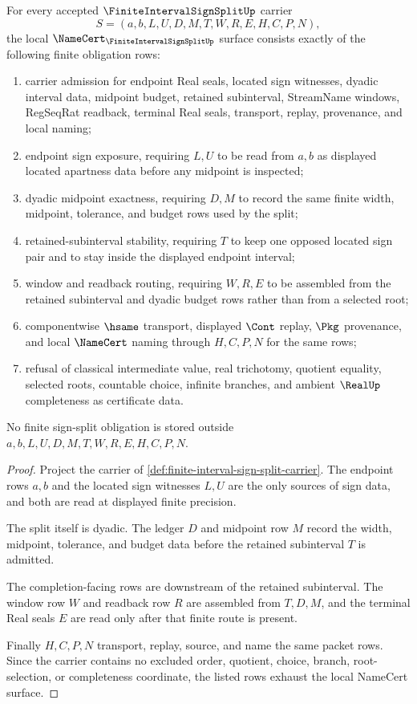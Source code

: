 \begin{theorem}
\label{thm:finite-interval-sign-split-namecert-obligations}
For every accepted $\FiniteIntervalSignSplitUp$ carrier
$$
S=(a,b,L,U,D,M,T,W,R,E,H,C,P,N),
$$
the local $\NameCert_{\FiniteIntervalSignSplitUp}$ surface consists exactly of the following finite obligation rows:
\begin{enumerate}
\item carrier admission for endpoint Real seals, located sign witnesses, dyadic interval data, midpoint budget, retained subinterval, StreamName windows, RegSeqRat readback, terminal Real seals, transport, replay, provenance, and local naming;
\item endpoint sign exposure, requiring $L,U$ to be read from $a,b$ as displayed located apartness data before any midpoint is inspected;
\item dyadic midpoint exactness, requiring $D,M$ to record the same finite width, midpoint, tolerance, and budget rows used by the split;
\item retained-subinterval stability, requiring $T$ to keep one opposed located sign pair and to stay inside the displayed endpoint interval;
\item window and readback routing, requiring $W,R,E$ to be assembled from the retained subinterval and dyadic budget rows rather than from a selected root;
\item componentwise $\hsame$ transport, displayed $\Cont$ replay, $\Pkg$ provenance, and local $\NameCert$ naming through $H,C,P,N$ for the same rows;
\item refusal of classical intermediate value, real trichotomy, quotient equality, selected roots, countable choice, infinite branches, and ambient $\RealUp$ completeness as certificate data.
\end{enumerate}
No finite sign-split obligation is stored outside $a,b,L,U,D,M,T,W,R,E,H,C,P,N$.
\end{theorem}
\begin{proof}
Project the carrier of \autoref{def:finite-interval-sign-split-carrier}. The endpoint rows $a,b$ and the located sign witnesses $L,U$ are the only sources of sign data, and both are read at displayed finite precision.

The split itself is dyadic. The ledger $D$ and midpoint row $M$ record the width, midpoint, tolerance, and budget data before the retained subinterval $T$ is admitted.

The completion-facing rows are downstream of the retained subinterval. The window row $W$ and readback row $R$ are assembled from $T,D,M$, and the terminal Real seals $E$ are read only after that finite route is present.

Finally $H,C,P,N$ transport, replay, source, and name the same packet rows. Since the carrier contains no excluded order, quotient, choice, branch, root-selection, or completeness coordinate, the listed rows exhaust the local NameCert surface.
\end{proof}

